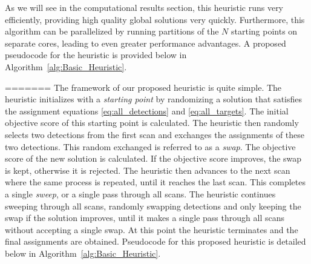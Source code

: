 As we will see in the computational results section, this heuristic runs very efficiently, providing high quality global solutions very quickly. Furthermore, this algorithm can be parallelized by running partitions of the $N$ starting points on separate cores, leading to even greater performance advantages. A proposed pseudocode for the heuristic is provided below in Algorithm~\ref{alg:Basic_Heuristic}. 

=======
The framework of our proposed heuristic is quite simple. The heuristic initializes with a \textit{starting point} by randomizing a solution that satisfies the assignment equations \eqref{eq:all_detections} and \eqref{eq:all_targets}. The initial objective score of this starting point is calculated. The heuristic then  randomly selects two detections from the first scan and exchanges the assignments of these two detections. This random exchanged is referred to as a \textit{swap}. The objective score of the new solution is calculated. If the objective score improves, the swap is kept, otherwise it is rejected. The heuristic then advances to the next scan where the same process is repeated, until it reaches the last scan. This completes a single \textit{sweep}, or a single pass through all scans. The heuristic continues sweeping through all scans, randomly swapping detections and only keeping the swap if the solution improves, until it makes a single pass through all scans without accepting a single swap. At this point the heuristic terminates and the final assignments are obtained. Pseudocode for this proposed heuristic is detailed below in Algorithm~\ref{alg:Basic_Heuristic}.

